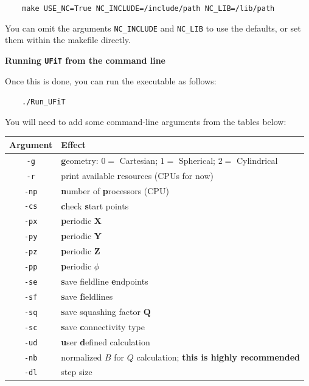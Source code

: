 \documentclass[12pt,twoside]{article}
\begin{document}
$\quad\quad$\texttt{make USE\_NC=True NC\_INCLUDE=/include/path NC\_LIB=/lib/path}

You can omit the arguments \texttt{NC\_INCLUDE} and \texttt{NC\_LIB} to use the defaults, or set them within the makefile directly.


\vspace{2mm}
{\Large \textbf{Running \texttt{UFiT} from the command line}}

Once this is done, you can run the executable as follows: 

$\quad\quad$\texttt{./Run\_UFiT}

You will need to add some command-line arguments from the tables below:

\vspace{2mm}

\begin{tabular}{|c|l|}		
		\hline
		\textbf{Argument} & \textbf{Effect} \\\hline\hline
		\texttt{-g} & \textbf{g}eometry: $0 =$ Cartesian; $1 =$ Spherical; $2 =$ Cylindrical  \\\hline
		\texttt{-r} & print available \textbf{r}esources (CPUs for now) \\\hline
		\texttt{-np} &  \textbf{n}umber of \textbf{p}rocessors (CPU) \\\hline
		\texttt{-cs} & \textbf{c}heck \textbf{s}tart points \\\hline
		\texttt{-px} & \textbf{p}eriodic \textbf{X} \\\hline
		\texttt{-py} & \textbf{p}eriodic \textbf{Y}  \\\hline
		\texttt{-pz} & \textbf{p}eriodic \textbf{Z}  \\\hline
		\texttt{-pp} & \textbf{p}eriodic $\phi$  \\\hline
		\texttt{-se} & \textbf{s}ave fieldline \textbf{e}ndpoints \\\hline
		\texttt{-sf} & \textbf{s}ave \textbf{f}ieldlines \\\hline
		\texttt{-sq} & \textbf{s}ave squashing factor $\mathbf{Q}$  \\\hline
		\texttt{-sc} & \textbf{s}ave \textbf{c}onnectivity type  \\\hline
		\texttt{-ud} & \textbf{u}ser \textbf{d}efined calculation  \\\hline
		\texttt{-nb} & normalized $B$ for $Q$ calculation; \textbf{this is highly recommended} \\\hline
		\texttt{-dl} & step size \\\hline

\end{tabular}
\end{document}

